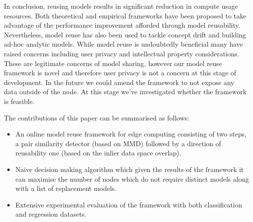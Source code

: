 \documentclass{mpaper}
\begin{document}
In conclusion, reusing models results in significant reduction in compute usage resources. Both theoretical and empirical frameworks have been proposed to take advantage of the performance improvement afforded through model reusability. Nevertheless, model reuse has also been used to tackle concept drift and building ad-hoc analytic models. While model reuse is undoubtedly beneficial many have raised concerns including user privacy and intellectual property considerations. These are legitimate concerns of model sharing, however  our model reuse  framework is novel and therefore user privacy is not a concern at this stage of development. In the future we could amend the framework to not expose any data outside of the node. At this stage we've investigated whether the framework is feasible. 

The contributions of this paper can be summarised as follows:
\begin{itemize}
    \item An online model reuse framework for edge computing consisting of two steps, a pair similarity detector (based on MMD) followed by a direction of reusability one (based on the inlier data space overlap). 
    \item Naive decision making algorithm which given the results of the framework it can maximise the number of nodes which do not require distinct models along with a list of replacement models.
    \item Extensive experimental evaluation of the framework with both classification and regression datasets.
\end{itemize}


    
\end{document}
